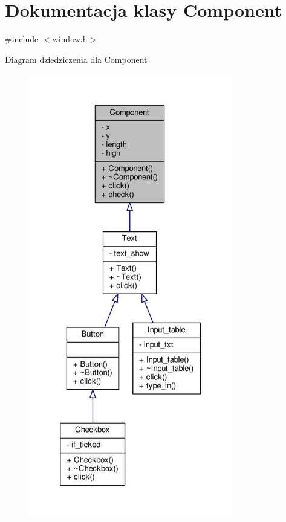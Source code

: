 \hypertarget{classComponent}{}\section{Dokumentacja klasy Component}
\label{classComponent}


{\ttfamily \#include $<$window.\+h$>$}



Diagram dziedziczenia dla Component
\nopagebreak
\begin{figure}[H]
\begin{center}
\leavevmode
\includegraphics[height=550pt]{classComponent__inherit__graph}
\end{center}
\end{figure}


